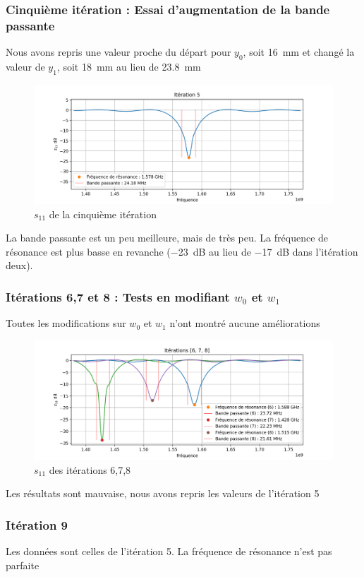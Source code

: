 \documentclass[Deriaz_Traiber_Labo02.tex]{subfiles}
\begin{document}
\subsubsection{Cinquième itération : Essai d'augmentation de la bande passante}
Nous avons repris une valeur proche du départ pour $y_0$, soit \SI{16}{\milli\meter} et changé la valeur de $y_1$, soit \SI{18}{\milli\meter} au lieu de \SI{23.8}{\milli\meter}
\begin{figure}[H]
\centering
\includegraphics[width=15cm]{../Calculs/run_id_fr4_5.png}
\caption[caption]{$s_{11}$ de la cinquième itération}
\end{figure}
La bande passante est un peu meilleure, mais de très peu. La fréquence de résonance est plus basse en revanche (\SI{-23}{\deci\bel} au lieu de \SI{-17}{\deci\bel} dans l'itération deux).
\subsubsection{Itérations 6,7 et 8 : Tests en modifiant $w_0$ et $w_1$}
Toutes les modifications sur $w_0$ et $w_1$ n'ont montré aucune améliorations
\begin{figure}[H]
\centering
\includegraphics[width=15cm]{../Calculs/run_id_fr4_678.png}
\caption[caption]{$s_{11}$ des itérations 6,7,8}
\end{figure}
Les résultats sont mauvaise, nous avons repris les valeurs de l'itération 5
\subsubsection{Itération 9}
Les données sont celles de l'itération 5. La fréquence de résonance n'est pas parfaite
\end{document}
